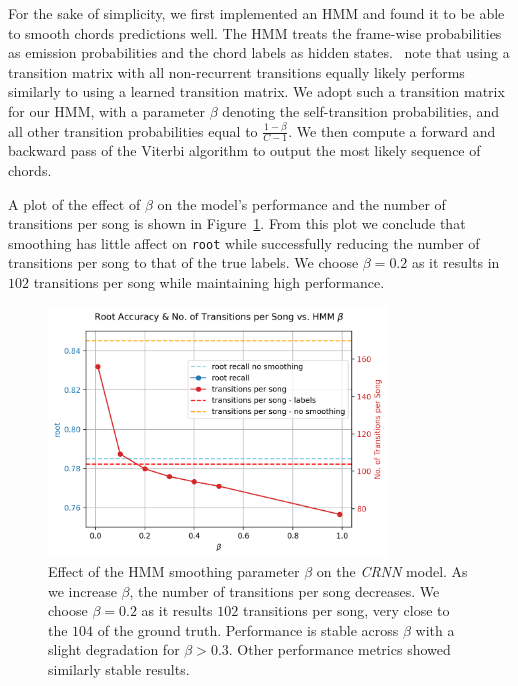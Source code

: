 For the sake of simplicity, we first implemented an HMM and found it to be able to smooth chords predictions well. The HMM treats the frame-wise probabilities as emission probabilities and the chord labels as hidden states.~\citet{CQTvsChroma} note that using a transition matrix with all non-recurrent transitions equally likely performs similarly to using a learned transition matrix. We adopt such a transition matrix for our HMM, with a parameter $\beta$ denoting the self-transition probabilities, and all other transition probabilities equal to $\frac{1-\beta}{C-1}$. We then compute a forward and backward pass of the Viterbi algorithm to output the most likely sequence of chords.

A plot of the effect of $\beta$ on the model's performance and the number of transitions per song is shown in Figure~\ref{fig:hmm_beta_search}. From this plot we conclude that smoothing has little affect on \texttt{root} while successfully reducing the number of transitions per song to that of the true labels. We choose $\beta = 0.2$ as it results in $102$ transitions per song while maintaining high performance.

\begin{figure}[H]
    \centering
    \includegraphics[width=0.8\textwidth]{figures/hmm_beta_vs_root_transitions.png}
    \caption{Effect of the HMM smoothing parameter $\beta$ on the \emph{CRNN} model. As we increase $\beta$, the number of transitions per song decreases. We choose $\beta = 0.2$ as it results $102$ transitions per song, very close to the $104$ of the ground truth. Performance is stable across $\beta$ with a slight degradation for $\beta > 0.3$. Other performance metrics showed similarly stable results. }\label{fig:hmm_beta_search}
\end{figure}

